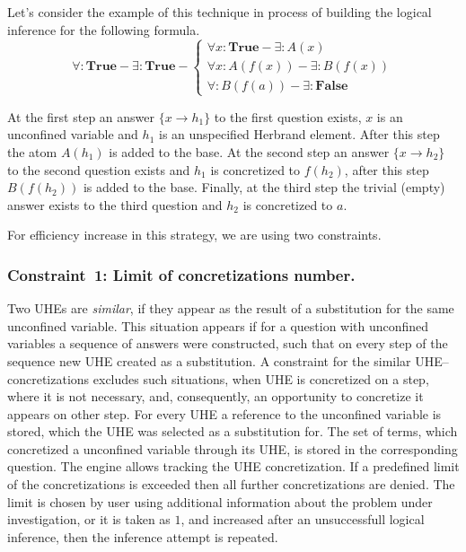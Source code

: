 \documentclass[runningheads,a4paper]{llncs}
\begin{document}
Let's consider the example of this technique in process of building the logical inference for the following formula.
\begin{equation*}
  \forall\colon\boldsymbol{True} - \exists\colon\boldsymbol{True} -
  \left\lbrace
  \begin{array}{l}
    \forall x\colon\boldsymbol{True} - \exists\colon A(x) \\
    \forall x\colon A(f(x)) - \exists\colon B(f(x)) \\
    \forall\colon B(f(a)) - \exists\colon \boldsymbol{False}
  \end{array}\right.
\end{equation*}

At the first step an answer $\{x \rightarrow h_1\}$ to the first question exists, $x$ is an unconfined variable and $h_1$ is an unspecified Herbrand element. After this step the atom $A(h_1)$ is added to the base. At the second step an answer $\{x \rightarrow h_2\}$ to the second question exists and $h_1$ is concretized to $f(h_2)$, after this step $B(f(h_2))$ is added to the base. Finally, at the third step the trivial (empty) answer exists to the third question and $h_2$ is concretized to $a$.

For efficiency increase in this strategy, we are using two constraints.

\subsubsection{Constraint~1: Limit of concretizations number.}

Two UHEs are \emph{similar}, if they appear as the result of a substitution for the same unconfined variable. This situation appears if for a question with unconfined variables a sequence of answers were constructed, such that on every step of the sequence new UHE created as a substitution. A constraint for the similar UHE--concretizations excludes such situations, when UHE is concretized on a step, where it is not necessary, and, consequently, an opportunity to concretize it appears on other step. For every UHE a reference to the unconfined variable is stored, which the UHE was selected as a substitution for. The set of terms, which concretized a unconfined variable through its UHE, is stored in the corresponding question. The engine allows tracking the UHE concretization. If a predefined limit of the concretizations is exceeded then all further concretizations are denied. The limit is chosen by user using additional information about the problem under investigation, or it is taken as $1$, and increased after an unsuccessfull logical inference, then the inference attempt is repeated.
\end{document}
